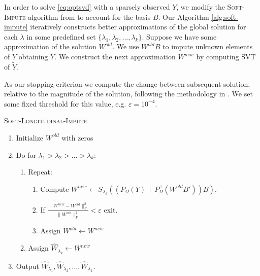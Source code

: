 \documentclass[preprint]{imsart}
\numberwithin{equation}{section}
\theoremstyle{plain}
\begin{document}
In order to solve \eqref{eq:optsvd} with a sparsely observed  $Y$, we modify the \textsc{Soft-Impute} algorithm from \citep{mazumder2010spectral} to account for the basis $B$. Our Algorithm \ref{alg:soft-impute} iteratively constructs better approximations of the global solution for each $\lambda$ in some predefined set $\{\lambda_1, \lambda_2, ..., \lambda_k\}$. Suppose we have some approximation of the solution $W^{old}$. We use $W^{old}B$ to impute unknown elements of $Y$ obtaining $\tilde{Y}$. We construct the next approximation $W^{new}$ by computing SVT of $\tilde{Y}$.

As our stopping criterion we compute the change between subsequent solution, relative to the magnitude of the solution, following the methodology in \cite{cai2010singular}. We set some fixed threshold for this value, e.g. $\varepsilon = 10^{-4}$.

\begin{algorithm}
\caption{\textsc{Soft-Longitudinal-Impute}\label{alg:soft-impute}}
\begin{enumerate}
\item Initialize $W^{old}$ with zeros
\item Do for $\lambda_1 > \lambda_2 > ... > \lambda_k$:
\begin{enumerate}
\item Repeat:
\begin{enumerate}
\item Compute $W^{new} \leftarrow S_{\lambda_k}( (P_\Omega(Y) + P_\Omega^\perp(W^{old}B'))B )$.
\item If $\frac{\|W^{new} - W^{old}\|_F^2}{\|W^{old}\|_F^2} < \varepsilon$ exit.
\item Assign $W^{old} \leftarrow W^{new}$
\end{enumerate}
\item Assign $\hat{W}_{\lambda_k} \leftarrow W^{new}$
\end{enumerate}
\item Output $\hat{W}_{\lambda_1}, \hat{W}_{\lambda_2}, ... , \hat{W}_{\lambda_k}$.
\end{enumerate}
\end{algorithm}
\end{document}

